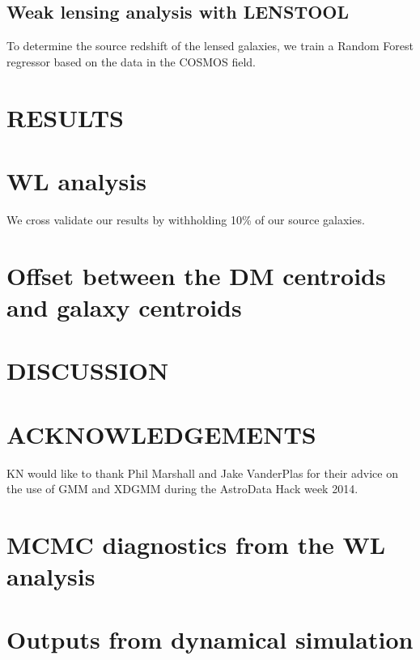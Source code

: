 \documentclass[letterpaper,useAMS,usenatbib]{mn2e}
\begin{document}
\subsection{Weak lensing analysis with LENSTOOL}
To determine the source redshift of the lensed galaxies, we train a Random
Forest regressor based on the data in the COSMOS field. 
\section{RESULTS}
\section{WL analysis}

We cross validate our results by withholding 10\% of our source galaxies. 



\section{Offset between the DM centroids and galaxy centroids}
\section{DISCUSSION}
\section{ACKNOWLEDGEMENTS}
KN would like to thank Phil Marshall and Jake VanderPlas for their advice on the use of GMM and
XDGMM during the AstroData Hack week 2014.



\appendix
\section{MCMC diagnostics from the WL analysis}
\section{Outputs from dynamical simulation}
\clearpage\bsp\label{lastpage} 
\end{document}
